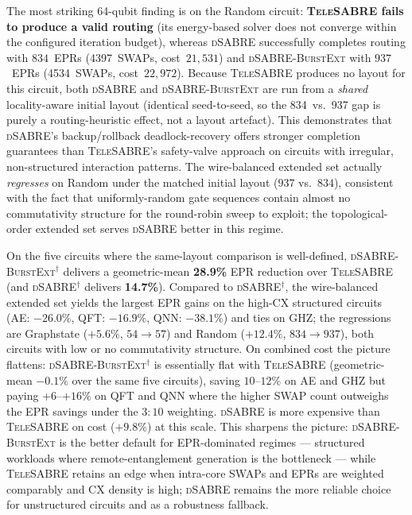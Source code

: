 \documentclass[conference]{IEEEtran}
\newcommand{\dSABRE}{\textsc{dSABRE}}
\newcommand{\BurstExt}{\textsc{dSABRE-BurstExt}}
\newcommand{\TeleSABRE}{\textsc{TeleSABRE}}
\begin{document}
The most striking 64-qubit finding is on the Random circuit:
\textbf{\TeleSABRE{} fails to produce a valid routing} (its energy-based
solver does not converge within the configured iteration budget), whereas
\dSABRE{} successfully completes routing with $834$~EPRs (4397~SWAPs,
cost~$21{,}531$) and \BurstExt{} with $937$~EPRs (4534~SWAPs, cost~$22{,}972$).
Because \TeleSABRE{} produces no layout for this circuit, both
\dSABRE{} and \BurstExt{} are run from a \emph{shared} locality-aware
initial layout (identical seed-to-seed, so the 834~vs.\ 937 gap is purely
a routing-heuristic effect, not a layout artefact).
This demonstrates that \dSABRE{}'s backup/rollback deadlock-recovery offers
stronger completion guarantees than \TeleSABRE{}'s safety-valve approach on
circuits with irregular, non-structured interaction patterns.
The wire-balanced extended set actually \emph{regresses} on Random under the
matched initial layout ($937$ vs.\ $834$), consistent with the fact that
uniformly-random gate sequences contain almost no commutativity structure
for the round-robin sweep to exploit; the topological-order extended set
serves \dSABRE{} better in this regime.

On the five circuits where the same-layout comparison is well-defined,
\BurstExt$^{\dagger}$ delivers a geometric-mean \textbf{28.9\%} EPR
reduction over \TeleSABRE{} (and \dSABRE$^{\dagger}$ delivers \textbf{14.7\%}).
Compared to \dSABRE$^{\dagger}$, the wire-balanced extended set yields the
largest EPR gains on the high-CX structured circuits (AE: $-26.0\%$,
QFT: $-16.9\%$, QNN: $-38.1\%$) and ties on GHZ; the regressions are
Graphstate ($+5.6\%$, $54 \to 57$) and Random ($+12.4\%$, $834 \to 937$),
both circuits with low or no commutativity structure.
On combined cost the picture flattens: \BurstExt$^{\dagger}$ is essentially
flat with \TeleSABRE{} (geometric-mean $-0.1\%$ over the same five circuits),
saving $10$--$12\%$ on AE and GHZ but paying $+6$--$+16\%$ on QFT and QNN
where the higher SWAP count outweighs the EPR savings under the $3{:}10$
weighting.  \dSABRE{} is more expensive than \TeleSABRE{} on cost
($+9.8\%$) at this scale.
This sharpens the picture: \BurstExt{} is the better default for
EPR-dominated regimes --- structured workloads where remote-entanglement
generation is the bottleneck --- while \TeleSABRE{} retains an edge when
intra-core SWAPs and EPRs are weighted comparably and CX density is high;
\dSABRE{} remains the more reliable choice for unstructured circuits and
as a robustness fallback.

\end{document}
